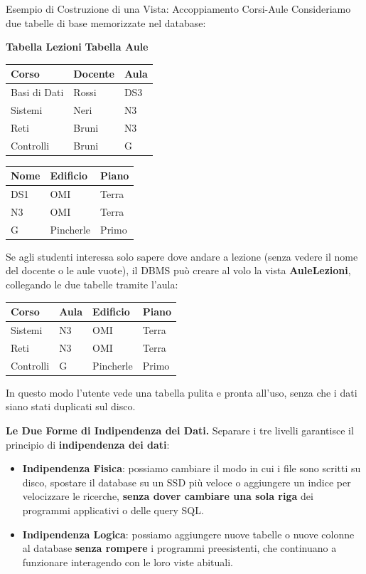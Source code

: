 \documentclass[12pt]{extarticle}
\begin{document}
\begin{cbox}{Esempio di Costruzione di una Vista: Accoppiamento Corsi-Aule}
\noindent Consideriamo due tabelle di base memorizzate nel database:
\begin{center}
\small
\textbf{Tabella Lezioni} \qquad \qquad \textbf{Tabella Aule} \\[1ex]
\begin{tabular}{lll}
    \toprule
    \textbf{Corso} & \textbf{Docente} & \textbf{Aula} \\
    \midrule
    Basi di Dati & Rossi & DS3 \\
    Sistemi & Neri & N3 \\
    Reti & Bruni & N3 \\
    Controlli & Bruni & G \\
    \bottomrule
\end{tabular}
\qquad
\begin{tabular}{lll}
    \toprule
    \textbf{Nome} & \textbf{Edificio} & \textbf{Piano} \\
    \midrule
    DS1 & OMI & Terra \\
    N3 & OMI & Terra \\
    G & Pincherle & Primo \\
    \bottomrule
\end{tabular}
\end{center}
\medskip
\noindent Se agli studenti interessa solo sapere dove andare a lezione (senza vedere il nome del docente o le aule vuote), il DBMS può creare al volo la vista \textbf{AuleLezioni}, collegando le due tabelle tramite l'aula:
\begin{center}
\small
\begin{tabular}{llll}
    \toprule
    \textbf{Corso} & \textbf{Aula} & \textbf{Edificio} & \textbf{Piano} \\
    \midrule
    Sistemi & N3 & OMI & Terra \\
    Reti & N3 & OMI & Terra \\
    Controlli & G & Pincherle & Primo \\
    \bottomrule
\end{tabular}
\end{center}
\medskip
\noindent In questo modo l'utente vede una tabella pulita e pronta all'uso, senza che i dati siano stati duplicati sul disco.
\end{cbox}

\medskip
\noindent \textbf{Le Due Forme di Indipendenza dei Dati.} Separare i tre livelli garantisce il principio di \textbf{indipendenza dei dati}:
\begin{itemize}
    \item \textbf{Indipendenza Fisica}: possiamo cambiare il modo in cui i file sono scritti su disco, spostare il database su un SSD più veloce o aggiungere un indice per velocizzare le ricerche, \textbf{senza dover cambiare una sola riga} dei programmi applicativi o delle query SQL.
    \item \textbf{Indipendenza Logica}: possiamo aggiungere nuove tabelle o nuove colonne al database \textbf{senza rompere} i programmi preesistenti, che continuano a funzionare interagendo con le loro viste abituali.
\end{itemize}
\end{document}
